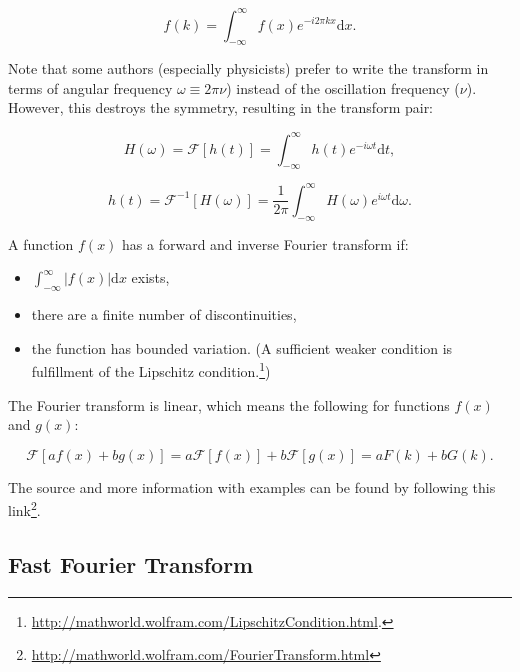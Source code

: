 \documentclass[12pt]{article}
\theoremstyle{plain}
\begin{document}
\begin{equation}
f(k) = \int_{-\infty}^{\infty} f(x) e^{-i 2 \pi k x} \text{d}x.
\end{equation}

Note that some authors (especially physicists) prefer to write the transform in terms of angular frequency $\omega \equiv 2 \pi \nu$) instead of the oscillation frequency ($\nu$). However, this destroys the symmetry, resulting in the transform pair:


\begin{equation}
H(\omega) = \mathcal{F}[h(t)] = \int_{-\infty}^{\infty} h(t) e^{-i \omega t} \text{d}t,
\end{equation}

\begin{equation}
h(t) = \mathcal{F}^{-1}[H(\omega)] = \frac{1}{2 \pi} \int_{-\infty}^{\infty} H(\omega) e^{i \omega t} \text{d}\omega.
\end{equation}

A function $f(x)$ has a forward and inverse Fourier transform if:

\begin{itemize}
	\item $\int_{-\infty}^{\infty} |f(x)| \text{d}x$ exists,
	\item there are a finite number of discontinuities,
	\item the function has bounded variation. (A sufficient weaker condition is fulfillment of the Lipschitz condition.\footnote{\url{http://mathworld.wolfram.com/LipschitzCondition.html}.})
\end{itemize}

The Fourier transform is linear, which means the following for functions $f(x)$ and $g(x)$:

\begin{equation}
\mathcal{F}[a f(x) + b g(x)] = a \mathcal{F}[f(x)] + b \mathcal{F}[g(x)] = a F(k) + b G(k).
\end{equation}

The source and more information with examples can be found by following this link\footnote{\url{http://mathworld.wolfram.com/FourierTransform.html}}. 

\subsection{Fast Fourier Transform}
\end{document}
